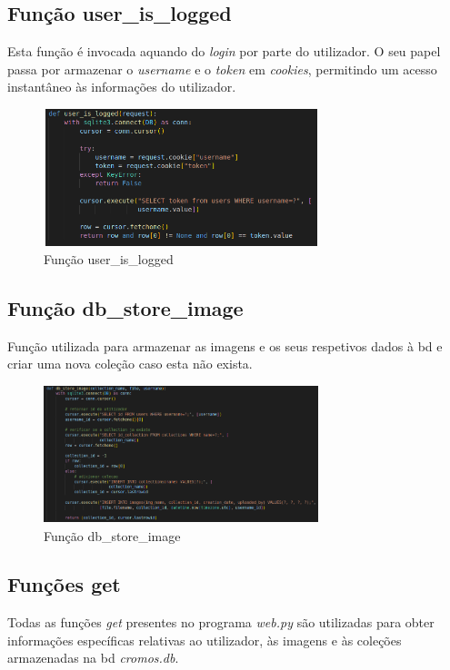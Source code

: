 \documentclass{report}
\begin{document}
\subsection{Função user\_is\_logged}
\label{ssec.funcaouserislogged}

Esta função é invocada aquando do \textit{login} por parte do utilizador. O seu papel passa por armazenar o \textit{username} e o \textit{token} em \textit{cookies}, permitindo um acesso instantâneo às informações do utilizador.

\begin{figure}[H]
	\centering
	\includegraphics[height=4cm, width=8cm]{images/userislogged.png}
	\caption{Função user\_is\_logged}
	\label{fig.userislogged}
\end{figure} 

\subsection{Função db\_store\_image}
\label{ssec.funcaodbstoreimage}

Função utilizada para armazenar as imagens e os seus respetivos dados à \ac{bd} e criar uma nova coleção caso esta não exista.

\begin{figure}[H]
	\centering
	\includegraphics[height=4cm, width=8cm]{images/dbstoreimage.png}
	\caption{Função db\_store\_image}
	\label{fig.funcaodbstoreimage}
\end{figure} 

\subsection{Funções get}
\label{ssec.funcoesget}
Todas as funções \textit{get} presentes no programa \textit{web.py} são utilizadas para obter informações específicas relativas ao utilizador, às imagens e às coleções armazenadas na \ac{bd} \textit{cromos.db}.
\end{document}
